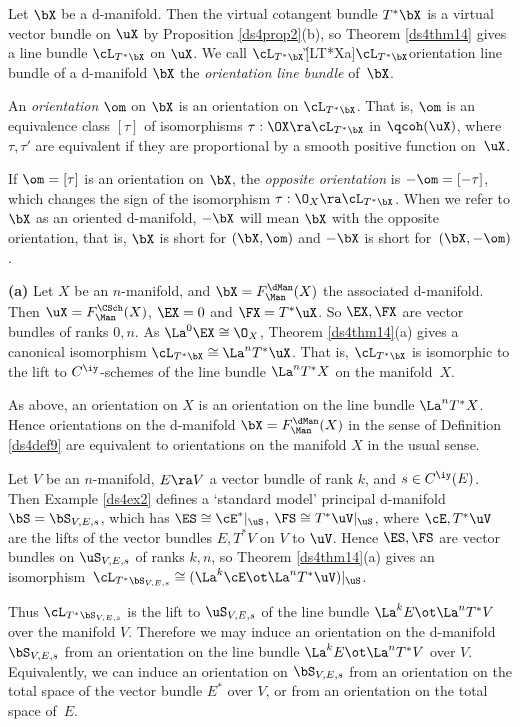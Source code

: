 \documentclass{article}
\begin{document}
\begin{dfn} Let $\bX$ be a d-manifold. Then the virtual cotangent
bundle $T^*\bX$ is a virtual vector
bundle on $\uX$ by Proposition \ref{ds4prop2}(b), so Theorem
\ref{ds4thm14} gives a line bundle $\cL_{T^*\bX}$ on $\uX$. We call
$\cL_{T^*\bX}$\G[LT*Xa]{$\cL_{T^*\bX}$}{orientation line bundle of a
d-manifold $\bX$} the {\it orientation line bundle\/} of~$\bX$.

An {\it orientation\/} $\om$ on $\bX$ is an orientation on
$\cL_{T^*\bX}$. That is, $\om$ is an equivalence class $[\tau]$ of
isomorphisms $\tau:\OX\ra\cL_{T^*\bX}$ in $\qcoh(\uX)$, where
$\tau,\tau'$ are equivalent if they are proportional by a smooth
positive function on~$\uX$.

If $\om=[\tau]$ is an orientation on $\bX$, the {\it opposite
orientation\/} is $-\om=[-\tau]$, which changes the sign of the
isomorphism $\tau:\O_X\ra\cL_{T^*\bX}$. When we refer to $\bX$ as an
oriented d-manifold, $-\bX$ will mean $\bX$ with the opposite
orientation, that is, $\bX$ is short for $(\bX,\om)$ and $-\bX$ is
short for~$(\bX,-\om)$.
\label{ds4def9}
\end{dfn}

\begin{ex}{\bf(a)} Let $X$ be an $n$-manifold, and
$\bX=F_\Man^\dMan(X)$ the associated d-manifold. Then
$\uX=F_\Man^\CSch(X)$, $\EX=0$ and $\FX=T^*\uX$. So $\EX,\FX$ are
vector bundles of ranks $0,n$. As $\La^0\EX\cong\O_X$, Theorem
\ref{ds4thm14}(a) gives a canonical isomorphism
$\cL_{T^*\bX}\cong\La^nT^*\uX$. That is, $\cL_{T^*\bX}$ is
isomorphic to the lift to $C^\iy$-schemes of the line bundle
$\La^nT^*X$ on the manifold~$X$.

As above, an orientation on $X$ is an orientation on the line bundle
$\La^nT^*X$. Hence orientations on the d-manifold
$\bX=F_\Man^\dMan(X)$ in the sense of Definition \ref{ds4def9} are
equivalent to orientations on the manifold $X$ in the usual sense.
\smallskip

 Let $V$ be an $n$-manifold, $E\ra V$ a vector
bundle of rank $k$, and $s\in C^\iy(E)$. Then Example \ref{ds4ex2}
defines a `standard model' principal d-manifold $\bS=\bS_{V,E,s}$,
which has $\ES\cong\cE^*\vert_\uS$, $\FS\cong T^*\uV\vert_\uS$,
where $\cE,T^*\uV$ are the lifts of the vector bundles $E,T^*V$ on
$V$ to $\uV$. Hence $\ES,\FS$ are vector bundles on $\uS_{V,E,s}$ of
ranks $k,n$, so Theorem \ref{ds4thm14}(a) gives an
isomorphism~$\cL_{T^*\bS_{V,E,s}}\cong(\La^k\cE\ot
\La^nT^*\uV)\vert_\uS$.

Thus $\cL_{T^*\bS_{V,E,s}}$ is the lift to $\uS_{V,E,s}$ of the line
bundle $\La^kE\ot\La^nT^*V$ over the manifold $V$. Therefore we may
induce an orientation on the d-manifold $\bS_{V,E,s}$ from an
orientation on the line bundle $\La^kE\ot\La^nT^*V$ over $V$.
Equivalently, we can induce an orientation on $\bS_{V,E,s}$ from an
orientation on the total space of the vector bundle $E^*$ over $V$,
or from an orientation on the total space of~$E$.
\label{ds4ex6}
\end{ex}
\end{document}
